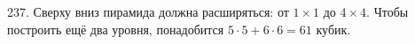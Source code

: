 237. Сверху вниз пирамида должна расширяться: от $1\times1$ до $4\times4.$ Чтобы построить ещё два уровня, понадобится $5\cdot5+6\cdot6=61$ кубик.\\
